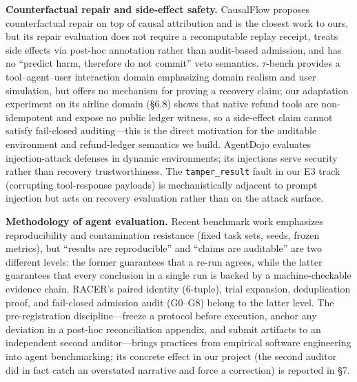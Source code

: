 \documentclass[10pt]{article}
\begin{document}
\textbf{Counterfactual repair and side-effect safety.} CausalFlow \cite{ref5} proposes counterfactual repair on top of causal attribution and is the closest work to ours, but its repair evaluation does not require a recomputable replay receipt, treats side effects via post-hoc annotation rather than audit-based admission, and has no ``predict harm, therefore do not commit'' veto semantics. $\tau$-bench \cite{ref6} provides a tool--agent--user interaction domain emphasizing domain realism and user simulation, but offers no mechanism for proving a recovery claim; our adaptation experiment on its airline domain (\S6.8) shows that native refund tools are non-idempotent and expose no public ledger witness, so a side-effect claim cannot satisfy fail-closed auditing---this is the direct motivation for the auditable environment and refund-ledger semantics we build. AgentDojo \cite{ref7} evaluates injection-attack defenses in dynamic environments; its injections serve security rather than recovery trustworthiness. The \texttt{tamper\_result} fault in our E3 track (corrupting tool-response payloads) is mechanistically adjacent to prompt injection but acts on recovery evaluation rather than on the attack surface.

\textbf{Methodology of agent evaluation.} Recent benchmark work emphasizes reproducibility and contamination resistance (fixed task sets, seeds, frozen metrics), but ``results are reproducible'' and ``claims are auditable'' are two different levels: the former guarantees that a re-run agrees, while the latter guarantees that every conclusion in a single run is backed by a machine-checkable evidence chain. RACER's paired identity (6-tuple), trial expansion, deduplication proof, and fail-closed admission audit (G0--G8) belong to the latter level. The pre-registration discipline---freeze a protocol before execution, anchor any deviation in a post-hoc reconciliation appendix, and submit artifacts to an independent second auditor---brings practices from empirical software engineering \cite{ref8,ref9} into agent benchmarking; its concrete effect in our project (the second auditor did in fact catch an overstated narrative and force a correction) is reported in \S7.
\end{document}
